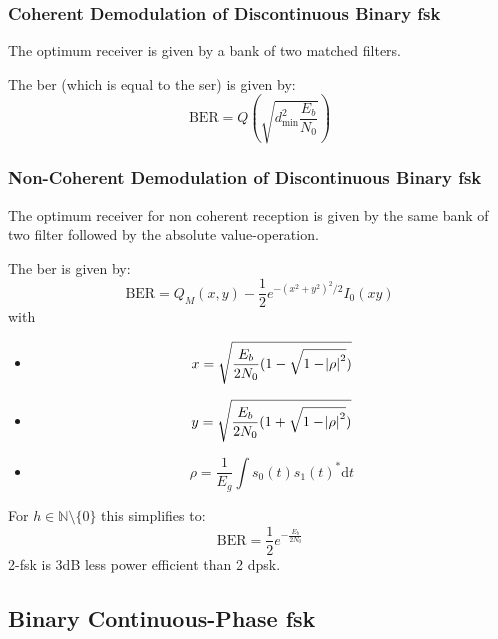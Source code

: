 \subsubsection{Coherent Demodulation of Discontinuous Binary \acl{fsk}}
The optimum receiver is given by a bank of two matched filters.

The \ac{ber} (which is equal to the \ac{ser}) is given by:
\begin{equation}
    \text{BER} = Q\left(\sqrt{d_\text{min}^2 \frac{E_b}{N_0}}\right)
\end{equation}
    
\subsubsection{Non-Coherent Demodulation of Discontinuous Binary \acl{fsk}}
The optimum receiver for non coherent reception is given by the same bank of two
filter followed by the absolute value-operation.

The \ac{ber} is given by:
\begin{equation}
    \text{BER} = Q_M(x, y) - \frac{1}{2} e^{-{(x^2 + y^2)}^2 / 2} I_0(xy)
\end{equation}
with
\begin{itemize}
    \item 
        \begin{equation}
            x = \sqrt{\frac{E_b}{2 N_0} (1-\sqrt{1 - \abs{\rho}^2})}
        \end{equation}
    \item
        \begin{equation}
            y = \sqrt{\frac{E_b}{2 N_0} (1+\sqrt{1 - \abs{\rho}^2})}
        \end{equation}
    \item
        \begin{equation}
            \rho = \frac{1}{E_g} \int s_0(t) s_1(t)^* \text{d}t
        \end{equation}
\end{itemize}

For $h \in \mathbb{N}\setminus \{0\}$ this simplifies to:
\begin{equation}
    \text{BER} = \frac{1}{2} e^{-\frac{E_b}{2 N_0}}
\end{equation}
2-\ac{fsk} is 3dB less power efficient than 2 \ac{dpsk}.

\subsection{Binary Continuous-Phase \ac{fsk}}
